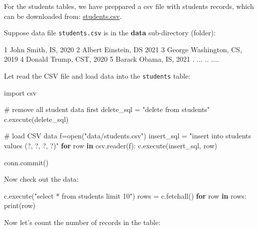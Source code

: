 \documentclass[
  letterpaper,
]{scrbook}
\newenvironment{Shaded}{\begin{snugshade}}{\end{snugshade}}
\newcommand{\BuiltInTok}[1]{\textcolor[rgb]{0.00,0.23,0.31}{#1}}
\newcommand{\CommentTok}[1]{\textcolor[rgb]{0.37,0.37,0.37}{#1}}
\newcommand{\ControlFlowTok}[1]{\textcolor[rgb]{0.00,0.23,0.31}{\textbf{#1}}}
\newcommand{\ImportTok}[1]{\textcolor[rgb]{0.00,0.46,0.62}{#1}}
\newcommand{\KeywordTok}[1]{\textcolor[rgb]{0.00,0.23,0.31}{\textbf{#1}}}
\newcommand{\NormalTok}[1]{\textcolor[rgb]{0.00,0.23,0.31}{#1}}
\newcommand{\OperatorTok}[1]{\textcolor[rgb]{0.37,0.37,0.37}{#1}}
\newcommand{\StringTok}[1]{\textcolor[rgb]{0.13,0.47,0.30}{#1}}
\begin{document}
For the students tables, we have preppared a csv file with students
records, which can be downloaded from:
\href{data/students.csv}{students.csv}.

Suppose data file \texttt{students.csv} is in the \textbf{data}
sub-directory (folder):

\begin{Shaded}
\begin{Highlighting}[]
\NormalTok{1   John Smith,        IS,  2020}
\NormalTok{2   Albert Einstein,   DS   2021}
\NormalTok{3   George Washington, CS,  2019}
\NormalTok{4   Donald Trump,      CST, 2020}
\NormalTok{5   Barack Obama,      IS,  2021}
\NormalTok{.   ...                ..   ....}
\end{Highlighting}
\end{Shaded}

Let read the CSV file and load data into the \texttt{students} table:

\begin{Shaded}
\begin{Highlighting}[]
\ImportTok{import}\NormalTok{ csv}

\CommentTok{\# remove all student data first}
\NormalTok{delete\_sql }\OperatorTok{=} \StringTok{"delete from students"}
\NormalTok{c.execute(delete\_sql)}

\CommentTok{\# load CSV data}
\NormalTok{f}\OperatorTok{=}\BuiltInTok{open}\NormalTok{(}\StringTok{"data/students.csv"}\NormalTok{)}
\NormalTok{insert\_sql }\OperatorTok{=} \StringTok{"insert into students values (?, ?, ?, ?)"}
\ControlFlowTok{for}\NormalTok{ row }\KeywordTok{in}\NormalTok{ csv.reader(f):}
\NormalTok{    c.execute(insert\_sql, row)}
    
\NormalTok{conn.commit()}
\end{Highlighting}
\end{Shaded}

Now check out the data:

\begin{Shaded}
\begin{Highlighting}[]
\NormalTok{c.execute(}\StringTok{"select * from students limit 10"}\NormalTok{)}
\NormalTok{rows }\OperatorTok{=}\NormalTok{ c.fetchall()}
\ControlFlowTok{for}\NormalTok{ row }\KeywordTok{in}\NormalTok{ rows: }
    \BuiltInTok{print}\NormalTok{(row)}
\end{Highlighting}
\end{Shaded}

Now let's count the number of records in the table:
\end{document}
